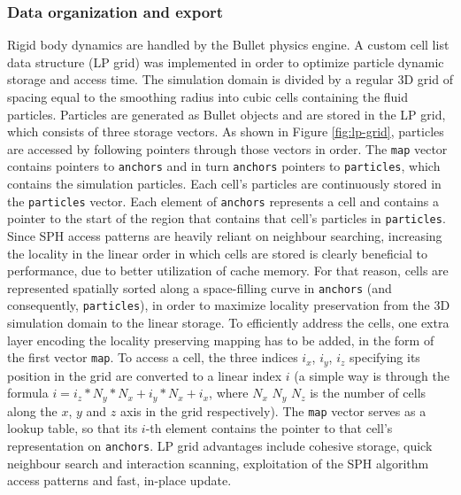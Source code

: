\documentclass{llncs}
\begin{document}
\subsubsection{Data organization and export} Rigid body dynamics are handled by the Bullet
physics engine. A custom cell list data structure (LP grid) was implemented in order to
optimize particle dynamic storage and access time. The simulation domain is divided by a
regular 3D grid of spacing equal to the smoothing radius into cubic cells containing the
fluid particles. Particles are generated as Bullet objects and are stored in the LP grid,
which consists of three storage vectors. As shown in Figure \ref{fig:lp-grid}, particles
are accessed by following pointers through those vectors in order. The \texttt{map} vector
contains pointers to \texttt{anchors} and in turn \texttt{anchors} pointers to
\texttt{particles}, which contains the simulation particles. Each cell's particles are
continuously stored in the \texttt{particles} vector. Each element of \texttt{anchors}
represents a cell and contains a pointer to the start of the region that contains that
cell's particles in \texttt{particles}. Since SPH access patterns are heavily reliant on
neighbour searching, increasing the locality in the linear order in which cells are stored
is clearly beneficial to performance, due to better utilization of cache memory. For that
reason, cells are represented spatially sorted along a space-filling curve in
\texttt{anchors} (and consequently, \texttt{particles}), in order to maximize locality
preservation from the 3D simulation domain to the linear storage. To efficiently address
the cells, one extra layer encoding the locality preserving mapping has to be added, in
the form of the first vector \texttt{map}. To access a cell, the three indices $i_x$,
$i_y$, $i_z$ specifying its position in the grid are converted to a linear index $i$ (a
simple way is through the formula $i = i_z * N_y * N_x + i_y * N_x + i_x$, where $N_x$
$N_y$ $N_z$ is the number of cells along the $x$, $y$ and $z$ axis in the grid
respectively). The \texttt{map} vector serves as a lookup table, so that its $i$-th
element contains the pointer to that cell's representation on \texttt{anchors}. LP grid
advantages include cohesive storage, quick neighbour search and interaction scanning,
exploitation of the SPH algorithm access patterns and fast, in-place update.
\end{document}
